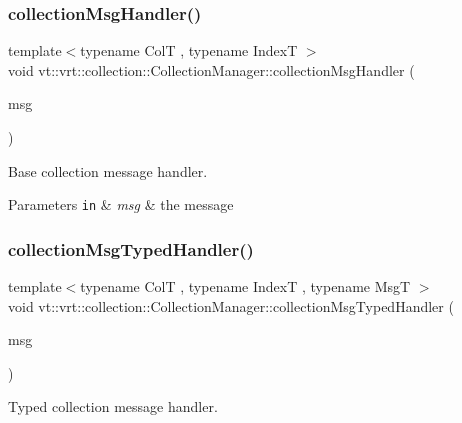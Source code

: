\subsubsection{\texorpdfstring{collection\+Msg\+Handler()}{collectionMsgHandler()}}
{\footnotesize\ttfamily template$<$typename ColT , typename IndexT $>$ \\
void vt\+::vrt\+::collection\+::\+Collection\+Manager\+::collection\+Msg\+Handler (\begin{DoxyParamCaption}\item[{\hyperlink{namespacevt_ac34f95a5e2b8109b55bfba52b074443d}{Base\+Message} $\ast$}]{msg }\end{DoxyParamCaption})\hspace{0.3cm}{\ttfamily [static]}}



Base collection message handler. 


\begin{DoxyParams}[1]{Parameters}
\mbox{\tt in}  & {\em msg} & the message \\
\hline
\end{DoxyParams}
\mbox{\label{structvt_1_1vrt_1_1collection_1_1_collection_manager_a7bb443544c8c4b94a7a10a0ec8126018}} 
\subsubsection{\texorpdfstring{collection\+Msg\+Typed\+Handler()}{collectionMsgTypedHandler()}}
{\footnotesize\ttfamily template$<$typename ColT , typename IndexT , typename MsgT $>$ \\
void vt\+::vrt\+::collection\+::\+Collection\+Manager\+::collection\+Msg\+Typed\+Handler (\begin{DoxyParamCaption}\item[{MsgT $\ast$}]{msg }\end{DoxyParamCaption})\hspace{0.3cm}{\ttfamily [static]}}



Typed collection message handler. 


